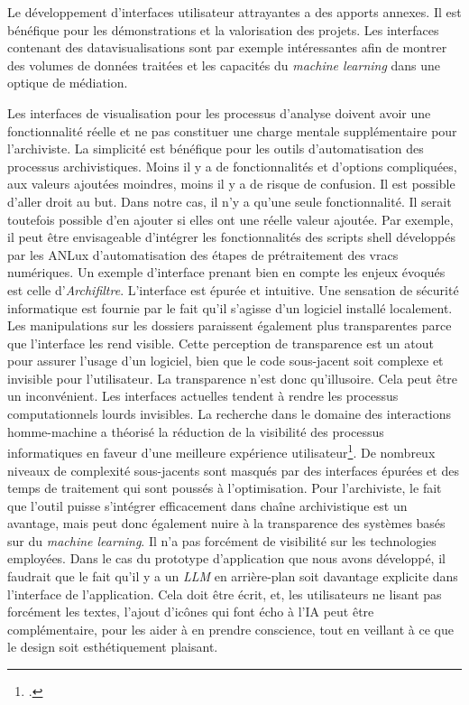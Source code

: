 Le développement d'interfaces utilisateur attrayantes a des apports annexes. Il est bénéfique pour les démonstrations et la valorisation des projets. Les interfaces contenant des datavisualisations sont par exemple intéressantes afin de montrer des volumes de données traitées et les capacités du \emph{machine learning} dans une optique de médiation.

Les interfaces de visualisation pour les processus d’analyse doivent avoir une fonctionnalité réelle et ne pas constituer une charge mentale supplémentaire pour l’archiviste. 
La simplicité est bénéfique pour les outils d'automatisation des processus archivistiques. Moins il y a de fonctionnalités et d'options compliquées, aux valeurs ajoutées moindres, moins il y a de risque de confusion. Il est possible d'aller droit au but. 
Dans notre cas, il n'y a qu'une seule fonctionnalité. Il serait toutefois possible d’en ajouter si elles ont une réelle valeur ajoutée.
Par exemple, il peut être envisageable d'intégrer les fonctionnalités des scripts shell développés par les ANLux d'automatisation des étapes de prétraitement des vracs numériques. 
Un exemple d'interface prenant bien en compte les enjeux évoqués est celle d'\emph{Archifiltre}. L'interface est épurée et intuitive. 
Une sensation de sécurité informatique est fournie par le fait qu'il s'agisse d'un logiciel installé localement.
Les manipulations sur les dossiers paraissent également plus transparentes parce que l'interface les rend visible. Cette perception de transparence est un atout pour assurer l'usage d'un logiciel, bien que le code sous-jacent soit complexe et invisible pour l’utilisateur. 
La transparence n'est donc qu'illusoire. Cela peut être un inconvénient. Les interfaces actuelles tendent à rendre les processus computationnels lourds invisibles. La recherche dans le domaine des interactions homme-machine a théorisé la réduction de la visibilité des processus informatiques en faveur d'une meilleure expérience utilisateur\footcite{pucheu_effacer_2018}. De nombreux niveaux de complexité sous-jacents sont masqués par des interfaces épurées et des temps de traitement qui sont poussés à l'optimisation.
Pour l’archiviste, le fait que l’outil puisse s'intégrer efficacement dans chaîne archivistique est un avantage, mais peut donc également nuire à la transparence des systèmes basés sur du \emph{machine learning}. Il n'a pas forcément de visibilité sur les technologies employées. Dans le cas du prototype d'application que nous avons développé, il faudrait que le fait qu’il y a un \emph{LLM} en arrière-plan soit davantage explicite dans l'interface de l'application. Cela doit être écrit, et, les utilisateurs ne lisant pas forcément les textes, l'ajout d'icônes qui font écho à l'IA peut être complémentaire, pour les aider à en prendre conscience, tout en veillant à ce que le design soit esthétiquement plaisant. 

